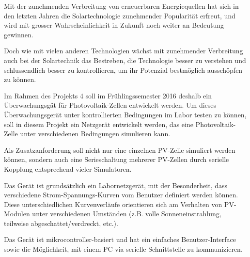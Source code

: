 Mit der  zunehmenden Verbreitung von  erneuerbaren Energiequellen hat  sich in
den letzten Jahren die Solartechnologie zunehmender Popularit\"at erfreut, und
wird  mit  grosser Wahrscheinlichkeit  in  Zukunft  noch weiter  an  Bedeutung
gewinnen.

Doch wie mit vielen anderen  Technologien w\"achst mit zunehmender Verbreitung
auch bei der  Solartechnik das Bestreben, die Technologie  besser zu verstehen
und  schlussendlich besser  zu kontrollieren,  um ihr  Potenzial bestm\"oglich
aussch\"opfen zu k\"onnen.

Im  Rahmen  des  Projekts  4  soll im  Fr\"uhlingssemester  2016  deshalb  ein
\"Uberwachungsg\"at  f\"ur  Photovoltaik-Zellen entwickelt  werden. Um  dieses
\"Uberwachungsger\"at  unter kontrollierten  Bedingungen  im  Labor testen  zu
k\"onnen, soll in  diesem Projekt ein Netzger\"at entwickelt  werden, das eine
Photovoltaik-Zelle unter verschiedenen Bedingungen simulieren kann.

Als Zusatzanforderung soll nicht nur  eine einzelnen PV-Zelle simuliert werden
k\"onnen, sondern  auch eine Serieschaltung mehrerer  PV-Zellen durch serielle
Kopplung entsprechend vieler Simulatoren.

Das Ger\"at  ist grunds\"atzlich  ein Labornetzger\"at, mit  der Besonderheit,
dass  verschiedene   Strom-Spannungs-Kurven  vom  Benutzer   definiert  werden
k\"onnen. Diese   unterschiedlichen  Kurvenverl\"aufe   orientieren  sich   am
Verhalten  von   PV-Modulen  unter   verschiedenen  Umst\"anden   (z.B.  volle
Sonneneinstrahlung, teilweise abgeschattet/verdreckt, etc.).

Das   Ger\"at    ist   mikrocontroller-basiert    und   hat    ein   einfaches
Benutzer-Interface  sowie  die  M\"oglichkeit,   mit  einem  PC  via  serielle
Schnittstelle zu kommunizieren.
